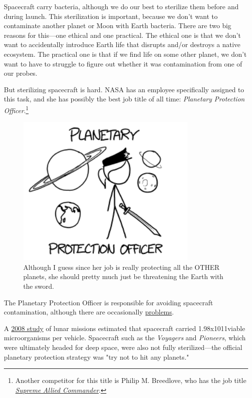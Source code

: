 {{Spacecraft carry bacteria, although we do our best to sterilize them before and during launch. This sterilization is important, because we don't want to contaminate another planet or Moon with Earth bacteria. There are two big reasons for this—one ethical and one practical. The ethical one is that we don't want to accidentally introduce Earth life that disrupts and/or destroys a native ecosystem. The practical one is that if we find life on some other planet, we don't want to have to struggle to figure out whether it was contamination from one of our probes.}

{But sterilizing spacecraft is hard. NASA has an employee specifically assigned to this task, and she has possibly the best job title of all time: \emph{Planetary Protection Officer}.{\footnote{Another competitor for this title is Philip M. Breedlove, who has the job title \emph{ \href{http://en.wikipedia.org/wiki/Supreme\_Allied\_Commander\#NATO}{Supreme Allied Commander}}.} } }

\begin{figure}[!htbp]
\centering
\includegraphics[scale=0.5, max width=0.8\textwidth]{imgs/a/117/officer.png}
\caption{Although I guess since her job is really protecting all the OTHER planets, she should pretty much just be threatening the Earth with the sword.}
\end{figure}

{The Planetary Protection Officer is responsible for avoiding spacecraft contamination, although there are occasionally \href{http://www.space.com/13783-nasa-msl-curiosity-mars-rover-planetary-protection.html}{problems}.}

{A \href{http://www.lpi.usra.edu/meetings/leagilewg2008/pdf/4029.pdf}{2008 study} of lunar missions estimated that spacecraft carried 1.98x1011viable microorganisms per vehicle. Spacecraft such as the \emph{Voyagers} and \emph{Pioneers}, which were ultimately headed for deep space, were also not fully sterilized—the official planetary protection strategy was "try not to hit any planets."}

}
